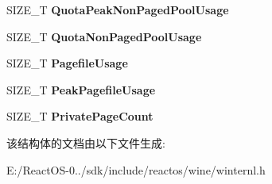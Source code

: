 \begin{DoxyCompactItemize}
S\+I\+Z\+E\+\_\+T {\bfseries Quota\+Peak\+Non\+Paged\+Pool\+Usage}
\item 
\mbox{\label{struct___v_m___c_o_u_n_t_e_r_s___a72789b029dad6e5712b9d8a8560506be}} 
S\+I\+Z\+E\+\_\+T {\bfseries Quota\+Non\+Paged\+Pool\+Usage}
\item 
\mbox{\label{struct___v_m___c_o_u_n_t_e_r_s___a98a4f187699cf101cd3b2c5a1d78ddb1}} 
S\+I\+Z\+E\+\_\+T {\bfseries Pagefile\+Usage}
\item 
\mbox{\label{struct___v_m___c_o_u_n_t_e_r_s___a5a41db9f8467f8fca2973c2e0c4b6b94}} 
S\+I\+Z\+E\+\_\+T {\bfseries Peak\+Pagefile\+Usage}
\item 
\mbox{\label{struct___v_m___c_o_u_n_t_e_r_s___a6884045dbc7921cbaeb357af138f812c}} 
S\+I\+Z\+E\+\_\+T {\bfseries Private\+Page\+Count}
\end{DoxyCompactItemize}


该结构体的文档由以下文件生成\+:\begin{DoxyCompactItemize}
\item 
E\+:/\+React\+O\+S-\/0../sdk/include/reactos/wine/winternl.\+h\end{DoxyCompactItemize}
